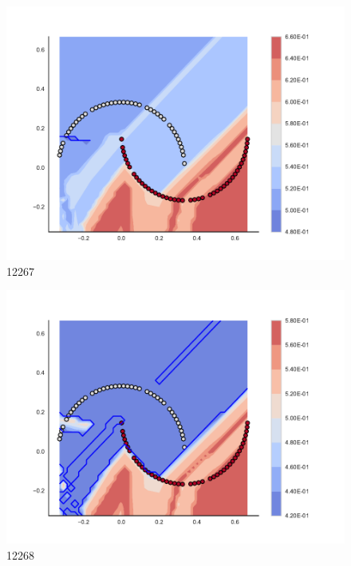 \begin{subfigure}[b]{0.09\textwidth}
    \includegraphics[clip, trim=2.35cm 1.75cm 4.5cm 0cm,width=\textwidth]{img/convergence/12267.pdf}
    \caption{12267}
    \label{fig:convergence_12267}
\end{subfigure}
%
\begin{subfigure}[b]{0.09\textwidth}
    \includegraphics[clip, trim=2.35cm 1.75cm 4.5cm 0cm,width=\textwidth]{img/convergence/12268.pdf}
    \caption{12268}
    \label{fig:convergence_12268}
\end{subfigure}
%

